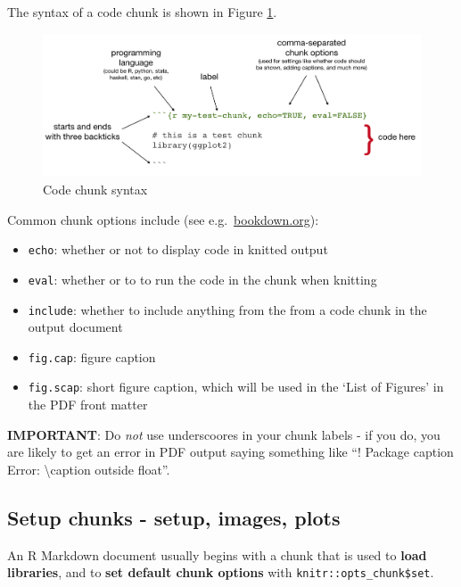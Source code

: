 \documentclass[a4paper, twoside]{templates/ociamthesis}
\providecommand{\tightlist}{%
  \setlength{\itemsep}{0pt}\setlength{\parskip}{0pt}}
\begin{document}
The syntax of a code chunk is shown in Figure \ref{fig:chunk-parts}.

\begin{figure}[H]
\includegraphics[width=1\linewidth]{figures/sample-content/chunk-parts} \caption{Code chunk syntax}\label{fig:chunk-parts}
\end{figure}

Common chunk options include (see e.g.~\href{https://bookdown.org/yihui/rmarkdown/r-code.html}{bookdown.org}):

\begin{itemize}
\tightlist
\item
  \texttt{echo}: whether or not to display code in knitted output
\item
  \texttt{eval}: whether or to to run the code in the chunk when knitting
\item
  \texttt{include}: whether to include anything from the from a code chunk in the output document
\item
  \texttt{fig.cap}: figure caption
\item
  \texttt{fig.scap}: short figure caption, which will be used in the `List of Figures' in the PDF front matter
\end{itemize}

\textbf{IMPORTANT}: Do \emph{not} use underscoores in your chunk labels - if you do, you are likely to get an error in PDF output saying something like ``! Package caption Error: \textbackslash caption outside float''.

\hypertarget{setup-chunks---setup-images-plots}{%
\subsection{Setup chunks - setup, images, plots}\label{setup-chunks---setup-images-plots}}

An R Markdown document usually begins with a chunk that is used to \textbf{load libraries}, and to \textbf{set default chunk options} with \texttt{knitr::opts\_chunk\$set}.
\end{document}
